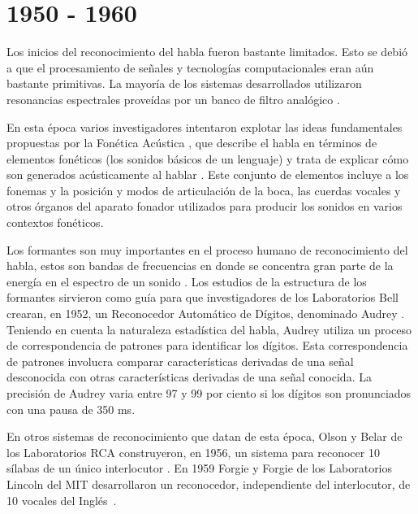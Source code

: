 \section{1950 - 1960}
\label{sec:50s}

Los inicios del reconocimiento del habla fueron bastante limitados. Esto se debi\'o a que el procesamiento 
de se\~{n}ales y tecnolog\'{i}as computacionales eran a\'un bastante primitivas. 
La mayor\'{i}a de los sistemas desarrollados utilizaron resonancias espectrales prove\'{i}das por 
un banco de filtro anal\'{o}gico \cite{Furui50Years2004}.
 
En esta \'{e}poca varios investigadores intentaron
explotar las ideas fundamentales propuestas por la Fon\'{e}tica Ac\'{u}stica \cite{AnusuyaSpeech2009}, que
describe el habla en t\'{e}rminos de elementos fon\'{e}ticos (los sonidos b\'{a}sicos de un lenguaje) y trata de
explicar c\'{o}mo son generados ac\'{u}sticamente al hablar \cite{JuangAutomaticSpeech}. 
Este conjunto de elementos incluye a los fonemas y la posici\'on y modos de articulaci\'on de la boca, 
las cuerdas vocales y otros \'organos del aparato fonador utilizados para producir los sonidos
en varios contextos fon\'{e}ticos.

Los formantes son muy importantes en el proceso humano de reconocimiento del habla, estos son bandas de frecuencias en 
donde se concentra gran parte de la energ\'{i}a en el espectro de un sonido \cite{HawkinsAcoustic2009}. Los estudios
de la estructura de los formantes sirvieron como gu\'{i}a para que investigadores de los Laboratorios Bell crearan, en 1952, 
un Reconocedor Autom\'{a}tico de D\'{i}gitos, denominado Audrey \cite{DavisAutomatic1952}. Teniendo en cuenta la naturaleza
estad\'{i}stica del habla, Audrey utiliza un proceso de correspondencia de patrones para identificar los d\'{i}gitos. Esta
correspondencia de patrones involucra comparar caracter\'{i}sticas derivadas de una se\~{n}al desconocida con
otras caracter\'{i}sticas derivadas de una se\~{n}al conocida. La precisi\'{o}n de Audrey varia entre 97 y 99 por ciento si
los d\'{i}gitos son pronunciados con una pausa de 350 ms.

En otros sistemas de reconocimiento que datan de esta \'{e}poca, Olson y Belar de los Laboratorios RCA construyeron, en 1956,
un sistema para reconocer 10 s\'{i}labas de un \'{u}nico interlocutor \cite{OlsonPhonetic1956}. En 1959 Forgie y Forgie de 
los Laboratorios Lincoln del MIT desarrollaron un reconocedor, independiente del interlocutor, de 10 vocales del
\mbox{Ingl\'{e}s \cite{ForgieResults1959}}.
